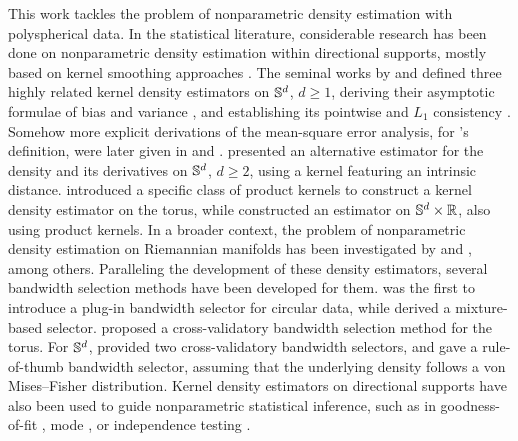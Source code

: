 \documentclass[oneside,11pt]{article}
\begin{document}
%
This work tackles the problem of nonparametric density estimation with polyspherical data. In the statistical literature, considerable research has been done on nonparametric density estimation within directional supports, mostly based on kernel smoothing approaches \citep[Section 7.1]{Pewsey2021}. The seminal works by \cite{Hall1987} and \cite{Bai1988} defined three highly related kernel density estimators on $\mathbb{S}^{d}$, $d\geq1$, deriving their asymptotic formulae of bias and variance \citep{Hall1987}, and establishing its pointwise and $L_1$ consistency \citep{Bai1988}. Somehow more explicit derivations of the mean-square error analysis, for \cite{Bai1988}'s definition, were later given in \cite{Zhao2001} and \cite{Garcia-Portugues2013b}. \cite{Klemela2000} presented an alternative estimator for the density and its derivatives on $\mathbb{S}^{d}$, $d\geq2$, using a kernel featuring an intrinsic distance. \cite{DiMarzio2011} introduced a specific class of product kernels to construct a kernel density estimator on the torus, while \cite{Garcia-Portugues2013b} constructed an estimator on $\mathbb{S}^{d}\times\mathbb{R}$, also using product kernels. In a broader context, the problem of nonparametric density estimation on Riemannian manifolds has been investigated by \cite{Pelletier2005} and \cite{Henry2009}, among others. Paralleling the development of these density estimators, several bandwidth selection methods have been developed for them. \cite{Taylor2008} was the first to introduce a plug-in bandwidth selector for circular data, while \cite{Oliveira2012} derived a mixture-based selector. \cite{DiMarzio2011} proposed a cross-validatory bandwidth selection method for the torus. For $\mathbb{S}^{d}$, \cite{Hall1987} provided two cross-validatory bandwidth selectors, and \cite{Garcia-Portugues2013a} gave a rule-of-thumb bandwidth selector, assuming that the underlying density follows a von Mises--Fisher distribution. Kernel density estimators on directional supports have also been used to guide nonparametric statistical inference, such as in goodness-of-fit \citep{Boente2014,Garcia-Portugues2015}, mode \citep{Ameijeiras-Alonso2019b}, or independence testing \citep{Garcia-Portugues2015}.
\end{document}
